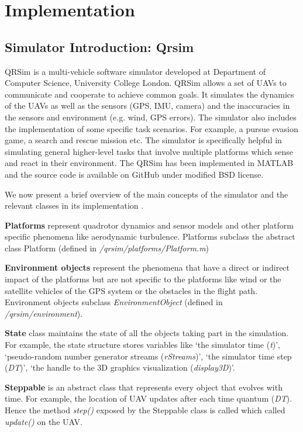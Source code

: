 \chapter{Implementation}
\label{chap-four}

\section{Simulator Introduction: Qrsim} \label{qrsim_intro}
QRSim \cite{denardi2013rn} is a multi-vehicle software simulator developed at Department of Computer Science, University College London. QRSim allows a set of UAVs to communicate and cooperate to achieve common goals. It simulates the dynamics of the UAVs as well as the sensors (GPS, IMU, camera) and the inaccuracies in the sensors and environment (e.g. wind, GPS errors). The simulator also includes the implementation of some specific task scenarios. For example, a pursue evasion game, a search and rescue mission etc. The simulator is specifically helpful in simulating general higher-level tasks that involve multiple platforms which sense and react in their environment. The QRSim has been implemented in MATLAB and the source code is available on GitHub \cite{qrsim_github} under modified BSD license.

We now present a brief overview of the main concepts of the simulator and the relevant classes in its implementation \cite{qrsim_github_manual}.

\textbf{Platforms} represent quadrotor dynamics and sensor models and other platform specific phenomena like aerodynamic turbulence. Platforms subclass the abstract class Platform (defined in \emph{/qrsim/platforms/Platform.m})

\textbf{Environment objects} represent the phenomena that have a direct or indirect impact of the platforms but are not specific to the platforms like wind or the satellite vehicles of the GPS system or the obstacles in the flight path. Environment objects subclass \emph{EnvironmentObject} (defined in \emph{/qrsim/environment}).

\textbf{State} class maintains the state of all the objects taking part in the simulation. For example, the state structure stores variables like `the simulator time (\emph{t})', `pseudo-random number generator streams (\emph{rStreams})', `the simulator time step (\emph{DT})', `the handle to the 3D graphics visualization (\emph{display3D})'.

\textbf{Steppable} is an abstract class that represents every object that evolves with time. For example, the location of UAV updates after each time quantum (\emph{DT}). Hence the method \emph{step()} exposed by the Steppable class is called which called \emph{update()} on the UAV.

